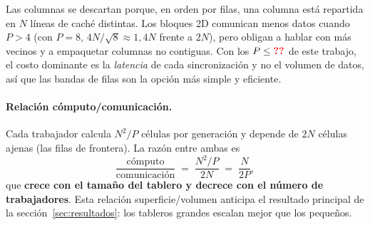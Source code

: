 \documentclass[11pt,a4paper]{article}
\makeatletter
\newcommand{\dato}[1]{\ifcsname dato@#1\endcsname\csname dato@#1\endcsname\else\textbf{\color{red}??}\fi}
\makeatother
\begin{document}
Las columnas se descartan porque, en orden por filas, una columna está repartida en $N$ líneas de caché
distintas. Los bloques 2D comunican menos datos cuando $P>4$ (con $P=8$, $4N/\sqrt{8}\approx1{,}4N$ frente a $2N$),
pero obligan a hablar con más vecinos y a empaquetar columnas no contiguas. Con los $P\le\dato{pmax}$ de este
trabajo, el costo dominante es la \emph{latencia} de cada sincronización y no el volumen de datos, así
que las bandas de filas son la opción más simple y eficiente.

\paragraph{Relación cómputo/comunicación.} Cada trabajador calcula $N^2/P$ células por generación y
depende de $2N$ células ajenas (las filas de frontera). La razón entre ambas es
\[
  \frac{\text{cómputo}}{\text{comunicación}} \;=\; \frac{N^2/P}{2N} \;=\; \frac{N}{2P},
\]
que \textbf{crece con el tamaño del tablero y decrece con el número de trabajadores}. Esta relación
superficie/volumen anticipa el resultado principal de la sección~\ref{sec:resultados}: los tableros grandes
escalan mejor que los pequeños.
\end{document}
